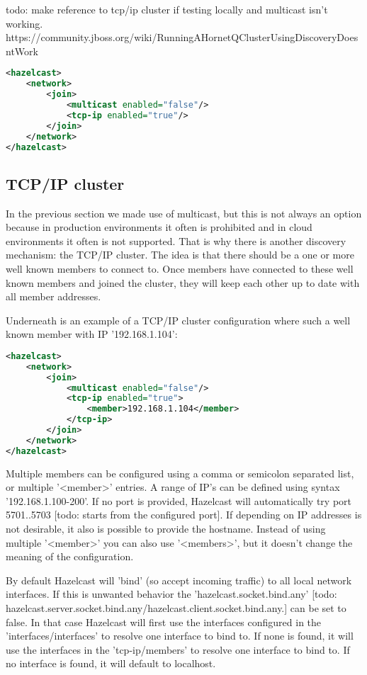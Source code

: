 todo: make reference to tcp/ip cluster if testing locally and multicast isn't working.
https://community.jboss.org/wiki/RunningAHornetQClusterUsingDiscoveryDoesntWork

\begin{lstlisting}[language=xml]
<hazelcast>
    <network>
        <join>
            <multicast enabled="false"/>
            <tcp-ip enabled="true"/>
        </join>
    </network>
</hazelcast>
\end{lstlisting}

\subsection{TCP/IP cluster}
In the previous section we made use of multicast, but this is not always an option because in production environments it often is prohibited and in cloud environments it often is not supported. That is why there is another discovery mechanism: the TCP/IP cluster. The idea is that there should be a one or more well known members to connect to. Once members have connected to these well known members and joined the cluster, they will keep each other up to date with all member addresses.

Underneath is an example of a TCP/IP cluster configuration where such a well known member with IP '192.168.1.104':
\begin{lstlisting}[language=xml]
<hazelcast>
    <network>
        <join>
            <multicast enabled="false"/>
            <tcp-ip enabled="true">
                <member>192.168.1.104</member> 
            </tcp-ip>
        </join>
    </network>
</hazelcast>
\end{lstlisting}
Multiple members can be configured using a comma or semicolon separated list, or multiple '<member>' entries. A range of IP's can be defined using syntax '192.168.1.100-200'. If no port is provided, Hazelcast will automatically try port 5701..5703 [todo: starts from the configured port]. If depending on IP addresses is not desirable, it also is possible to provide the hostname. Instead of using multiple '<member>' you can also use '<members>', but it doesn't change the meaning of the configuration. 

By default Hazelcast will 'bind' (so accept incoming traffic) to all local network interfaces. If this is unwanted behavior the 'hazelcast.socket.bind.any' [todo: hazelcast.server.socket.bind.any/hazelcast.client.socket.bind.any.] can be set to false. In that case Hazelcast will first use the interfaces configured in the 'interfaces/interfaces' to resolve one interface to bind to. If none is found, it will use the interfaces in the 'tcp-ip/members' to resolve one interface to bind to. If no interface is found, it will default to localhost.

